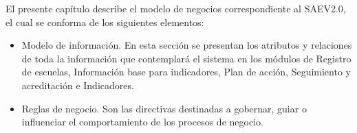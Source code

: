 
El presente capítulo describe el modelo de negocios correspondiente al SAEV2.0, el cual se conforma de los siguientes elementos:

\begin{itemize}
    \item Modelo de información. En esta sección se presentan los atributos y relaciones de toda la información que contemplará el sistema en los módulos de Registro de escuelas, Información base para indicadores, Plan de acción, Seguimiento y acreditación e Indicadores.

    \item Reglas de negocio. Son las directivas destinadas a gobernar, guiar o influenciar el comportamiento de los procesos de negocio.
\end{itemize}


